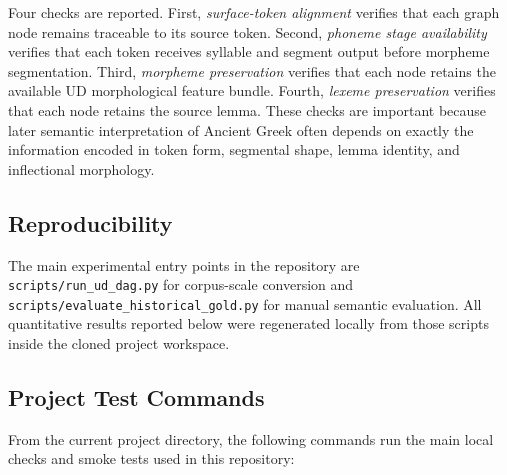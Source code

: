 \documentclass[11pt]{article}
\begin{document}
Four checks are reported. First, \emph{surface-token alignment} verifies that
each graph node remains traceable to its source token. Second, \emph{phoneme
stage availability} verifies that each token receives syllable and segment
output before morpheme segmentation. Third, \emph{morpheme preservation}
verifies that each node retains the available UD morphological feature bundle.
Fourth, \emph{lexeme preservation} verifies that each node retains the source
lemma. These checks are important because later semantic interpretation of
Ancient Greek often depends on exactly the information encoded in token form,
segmental shape, lemma identity, and inflectional morphology.

\subsection{Reproducibility}
The main experimental entry points in the repository are
\texttt{scripts/run\_ud\_dag.py} for corpus-scale conversion and
\texttt{scripts/evaluate\_historical\_gold.py} for manual semantic evaluation.
All quantitative results reported below were regenerated locally from those
scripts inside the cloned project workspace.

\subsection{Project Test Commands}
From the current project directory, the following commands run the main local
checks and smoke tests used in this repository:
\end{document}

